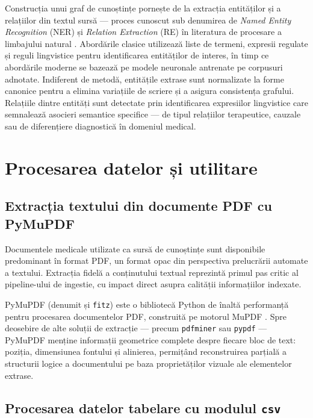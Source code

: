 \documentclass[12pt, a4paper, oneside, romanian]{teza-upb}
\begin{document}
Construcția unui graf de cunoștințe pornește de la extracția entităților și a 
relațiilor din textul sursă — proces cunoscut sub denumirea de 
\textit{Named Entity Recognition} (NER) și \textit{Relation Extraction} (RE) 
în literatura de procesare a limbajului natural \cite{jurafsky2023}. Abordările 
clasice utilizează liste de termeni, expresii regulate și reguli lingvistice 
pentru identificarea entităților de interes, în timp ce abordările moderne 
se bazează pe modele neuronale antrenate pe corpusuri adnotate. Indiferent de 
metodă, entitățile extrase sunt normalizate la forme canonice pentru a elimina 
variațiile de scriere și a asigura consistența grafului. Relațiile dintre 
entități sunt detectate prin identificarea expresiilor lingvistice care 
semnalează asocieri semantice specifice — de tipul relațiilor terapeutice, 
cauzale sau de diferențiere diagnostică în domeniul medical.

\section{Procesarea datelor și utilitare}

\subsection{Extracția textului din documente PDF cu PyMuPDF}

Documentele medicale utilizate ca sursă de cunoștințe sunt disponibile predominant în format PDF, un format opac din perspectiva prelucrării automate a textului. Extracția fidelă a conținutului textual reprezintă primul pas critic al pipeline-ului de ingestie, cu impact direct asupra calității informațiilor indexate.

PyMuPDF (denumit și \texttt{fitz}) este o bibliotecă Python de înaltă performanță pentru procesarea documentelor PDF, construită pe motorul MuPDF \cite{pymupdf_doc}. Spre deosebire de alte soluții de extracție — precum \texttt{pdfminer} sau \texttt{pypdf} — PyMuPDF menține informații geometrice complete despre fiecare bloc de text: poziția, dimensiunea fontului și alinierea, permițând reconstruirea parțială a structurii logice a documentului pe baza proprietăților vizuale ale elementelor extrase.

\subsection{Procesarea datelor tabelare cu modulul \texttt{csv}}
\end{document}
